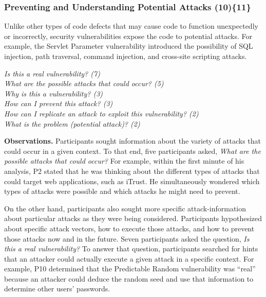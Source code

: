 \documentclass{acm_proc_article-sp}
\begin{document}

\subsubsection{\textbf{Preventing and Understanding Potential Attacks (10)\{11\}}}\label{pupa}
Unlike other types of code defects that may cause code to function unexpectedly or incorrectly, security vulnerabilities expose the code to potential attacks. For example, the Servlet Parameter vulnerability introduced the possibility of SQL injection, path traversal, command injection, and cross-site scripting attacks.


\noindent\emph{Is this a real vulnerability? (7)} \\
\emph{What are the possible attacks that could occur? (5)} \\
\emph{Why is this a vulnerability? (3)} \\
\emph{How can I prevent this attack? (3)} \\
\emph{How can I replicate an attack to exploit this vulnerability? (2)} \\
\emph{What is the problem (potential attack)? (2)} 

\noindent\textbf{Observations.}
Participants sought information about the variety of attacks that could occur in a given context.
To that end, five participants asked, \textit{What are the possible attacks that could occur?}
For example, within the first minute of his analysis, P2 stated that he was thinking about the different types of attacks that could target web applications, such as iTrust. He simultaneously wondered which types of attacks were possible and which attacks he might need to prevent.

On the other hand, participants also sought more specific attack-information about particular attacks as they were being considered.
Participants hypothesized about specific attack vectors, how to execute those attacks, and how to prevent those attacks now and in the future.
Seven participants asked the question, \textit{Is this a real vulnerability?} To answer that question, participants searched for hints that an attacker could actually execute a given attack in a specific context. For example, P10 determined that the Predictable Random vulnerability was ``real'' because an attacker could deduce the random seed and use that information to determine other users' passwords. 
\end{document}
